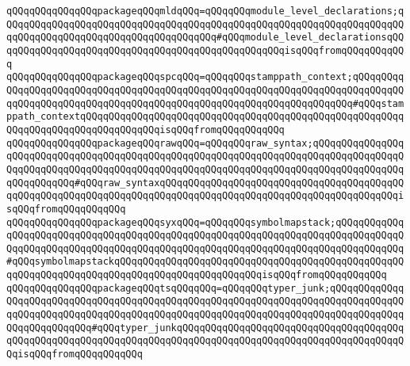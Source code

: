 \verb|qQQqqQQqqQQqqQQqpackageqQQqmldqQQq=qQQqqQQqmodule_level_declarations;qQQqqQQqqQQqqQQqqQQqqQQqqQQqqQQqqQQqqQQqqQQqqQQqqQQqqQQqqQQqqQQqqQQqqQQqqQQqqQQqqQQqqQQqqQQqqQQqqQQqqQQqqQQq#qQQqmodule_level_declarationsqQQqqQQqqQQqqQQqqQQqqQQqqQQqqQQqqQQqqQQqqQQqqQQqqQQqisqQQqfromqQQqqQQqqQQq|\newline
\verb|qQQqqQQqqQQqqQQqpackageqQQqspcqQQq=qQQqqQQqstamppath_context;qQQqqQQqqQQqqQQqqQQqqQQqqQQqqQQqqQQqqQQqqQQqqQQqqQQqqQQqqQQqqQQqqQQqqQQqqQQqqQQqqQQqqQQqqQQqqQQqqQQqqQQqqQQqqQQqqQQqqQQqqQQqqQQqqQQqqQQqqQQq#qQQqstamppath_contextqQQqqQQqqQQqqQQqqQQqqQQqqQQqqQQqqQQqqQQqqQQqqQQqqQQqqQQqqQQqqQQqqQQqqQQqqQQqqQQqqQQqisqQQqfromqQQqqQQqqQQq|\newline
\verb|qQQqqQQqqQQqqQQqpackageqQQqrawqQQq=qQQqqQQqraw_syntax;qQQqqQQqqQQqqQQqqQQqqQQqqQQqqQQqqQQqqQQqqQQqqQQqqQQqqQQqqQQqqQQqqQQqqQQqqQQqqQQqqQQqqQQqqQQqqQQqqQQqqQQqqQQqqQQqqQQqqQQqqQQqqQQqqQQqqQQqqQQqqQQqqQQqqQQqqQQqqQQqqQQqqQQq#qQQqraw_syntaxqQQqqQQqqQQqqQQqqQQqqQQqqQQqqQQqqQQqqQQqqQQqqQQqqQQqqQQqqQQqqQQqqQQqqQQqqQQqqQQqqQQqqQQqqQQqqQQqqQQqqQQqqQQqqQQqisqQQqfromqQQqqQQqqQQq|\newline
\verb|qQQqqQQqqQQqqQQqpackageqQQqsyxqQQq=qQQqqQQqsymbolmapstack;qQQqqQQqqQQqqQQqqQQqqQQqqQQqqQQqqQQqqQQqqQQqqQQqqQQqqQQqqQQqqQQqqQQqqQQqqQQqqQQqqQQqqQQqqQQqqQQqqQQqqQQqqQQqqQQqqQQqqQQqqQQqqQQqqQQqqQQqqQQqqQQqqQQqqQQq#qQQqsymbolmapstackqQQqqQQqqQQqqQQqqQQqqQQqqQQqqQQqqQQqqQQqqQQqqQQqqQQqqQQqqQQqqQQqqQQqqQQqqQQqqQQqqQQqqQQqqQQqqQQqisqQQqfromqQQqqQQqqQQq|\newline
\verb|qQQqqQQqqQQqqQQqpackageqQQqtsqQQqqQQq=qQQqqQQqtyper_junk;qQQqqQQqqQQqqQQqqQQqqQQqqQQqqQQqqQQqqQQqqQQqqQQqqQQqqQQqqQQqqQQqqQQqqQQqqQQqqQQqqQQqqQQqqQQqqQQqqQQqqQQqqQQqqQQqqQQqqQQqqQQqqQQqqQQqqQQqqQQqqQQqqQQqqQQqqQQqqQQqqQQqqQQq#qQQqtyper_junkqQQqqQQqqQQqqQQqqQQqqQQqqQQqqQQqqQQqqQQqqQQqqQQqqQQqqQQqqQQqqQQqqQQqqQQqqQQqqQQqqQQqqQQqqQQqqQQqqQQqqQQqqQQqqQQqisqQQqfromqQQqqQQqqQQq|\newline
